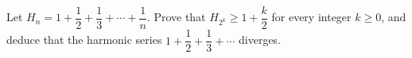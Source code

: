 Let $H_n=1+\dfrac12+\dfrac13+\cdots+\dfrac1n$. Prove that $H_{2^k}\ge1+\dfrac k2$ for every integer $k\ge0$, and deduce that the harmonic series $1+\dfrac12+\dfrac13+\cdots$ diverges.

